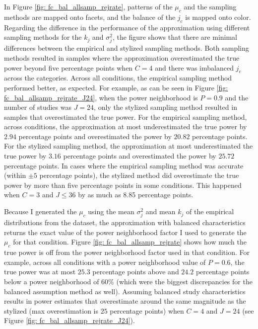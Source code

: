 
In Figure \ref{fig: fc_bal_allsamp_rejrate}, patterns of the $\mu_c$ and the sampling methods are mapped onto facets, and the balance of the $j_c$ is mapped onto color. Regarding the difference in the performance of the approximation using different sampling methods for the $k_j$ and $\sigma_j^2$, the figure shows that there are minimal differences between the empirical and stylized sampling methods. Both sampling methods resulted in samples where the approximation overestimated the true power beyond five percentage points when $C = 4$ and there was imbalanced $j_c$ across the categories. Across all conditions, the empirical sampling method performed better, as expected. For example, as can be seen in Figure \ref{fig: fc_bal_allsamp_rejrate_J24}, when the power neighborhood is $P = 0.9$ and the number of studies was $J= 24$, only the stylized sampling method resulted in samples that overestimated the true power. For the empirical sampling method, across conditions, the approximation at most underestimated the true power by $2.94$ percentage points and overestimated the power by $20.82$ percentage points. For the stylized sampling method, the approximation at most underestimated the true power by $3.16$ percentage points and overestimated the power by $25.72$ percentage points. In cases where the empirical sampling method was accurate (within $\pm 5$ percentage points), the stylized method did overestimate the true power by more than five percentage points in some conditions. This happened when $C = 3$ and $J \leq 36$ by as much as 8.85 percentage points. 

Because I generated the $\mu_c$ using the mean $\sigma_j^2$ and mean $k_j$ of the empirical distributions from the \textcite{WilliamsRyan2022HiMI} dataset, the approximation with balanced characteristics returns the exact value of the power neighborhood factor I used to generate the $\mu_c$ for that condition. Figure \ref{fig: fc_bal_allsamp_rejrate} shows how much the true power is off from the power neighborhood factor used in that condition. For example, across all conditions with a power neighborhood value of $P = 0.6$, the true power was at most $25.3$ percentage points above and $24.2$ percentage points below a power neighborhood of $60\%$ (which were the biggest discrepancies for the balanced assumption method as well). Assuming balanced study characteristics results in power estimates that overestimate around the same magnitude as the stylized (max overestimation is $25$ percentage points) when $C=4$ and $J=24$ (see Figure \ref{fig: fc_bal_allsamp_rejrate_J24}). 

